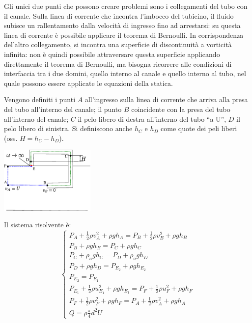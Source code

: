 Gli unici due punti che possono creare problemi sono i collegamenti del tubo con il canale.
Sulla linea di corrente che incontra l'imbocco del tubicino, il fluido subisce un rallentamento dalla velocità di ingresso fino ad arrestarsi: su questa linea di corrente è possibile applicare il teorema di Bernoulli.
In corrispondenza del'altro collegamento, si incontra una superficie di discontinuità a vorticità infinita: non è quindi possibile attraversare questa superficie applicando direttamente il teorema di Bernoulli, ma bisogna ricorrere alle condizioni di interfaccia tra i due domini, quello interno al canale e quello interno al tubo, nel quale possono essere applicate le equazioni della statica.

Vengono definiti i punti  $A$  all'ingresso sulla linea di corrente che arriva alla presa del tubo all'interno del canale; il punto $B$ coincidente con la presa del tubo all'interno del canale; $C$ il pelo libero di destra all'interno del tubo ``a U'', $D$ il pelo libero di sinistra. Si definiscono anche $h_C$ e $h_D$ come quote dei peli liberi (oss. $H = h_C - h_D$).

\begin{center}
  \includegraphics[width=0.35\textwidth]{./fig/Canale01.eps}
\end{center}

Il sistema risolvente è:
\begin{equation}
\begin{cases}
  P_A + \frac{1}{2} \rho v_A^2 + \rho g h_A =
   P_B + \frac{1}{2} \rho v_B^2 + \rho g h_B\\
  P_B + \rho g h_B = P_C + \rho g h_C   \\
  P_C + \rho_a g h_C = P_D + \rho_a g h_D\\
  P_D + \rho g h_D = P_{E_2} + \rho g h_{E_2} \\
  P_{E_2} = P_{E_1} \\
  P_{E_1} + \frac{1}{2} \rho u_{E_1}^2 + \rho g h_{E_1} = P_F + \frac{1}{2} \rho u_F^2 + \rho g h_F\\
 P_F + \frac{1}{2} \rho v_F^2 + \rho g h_F = P_A + \frac{1}{2} \rho v_A^2 + \rho g h_A \\
  \bar{Q} = \rho \frac{\pi}{4}d^2 U
\end{cases}
\end{equation}


